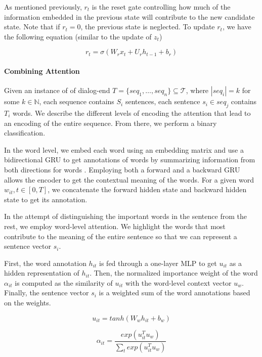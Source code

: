 As mentioned previously, $r_t$ is the reset gate 
controlling how much of the information embedded in 
the previous state will contribute to the new candidate state. 
Note that if $r_t = 0$, the previous state is neglected. 
To update $r_t$, we have the following equation (similar to the update of $z_t$)

\begin{equation*}
	r_t = \sigma(W_r x_t + U_r h_{t-1} + b_r)
\end{equation*}

\paragraph*{Combining Attention}
Given an instance of of dialog-end $T=\{seq_1, \ldots, seq_n\} \subseteq \mathcal{T}$, where $|seq_i| = k$ for some $k \in \mathbb{N}$, each sequence contains $S_i$ sentences, each sentence $s_i \in seq_j$ contains $T_i$ words. 
We describe the different levels of encoding the attention that lead 
to an encoding of the entire sequence. From there, we perform 
a binary classification. 

In the word level, we embed each word using an embedding matrix \cite{glove} 
and use a bidirectional GRU 
to get annotations of words by summarizing information
from both directions for words \cite{attention}. 
Employing both a forward and a backward GRU 
allows the encoder to get the contextual meaning of the words. 
For a given word $w_{it}, t\in [0,T]$, 
we concatenate the forward hidden state and
backward hidden state to get its annotation. 

In the attempt of distinguishing the important 
words in the sentence from the rest, we employ word-level 
attention. We highlight the words that most contribute 
to the meaning of the entire sentence so that we can represent 
a sentence vector $s_i$. 

First, the word annotation $h_{it}$ is fed 
through a one-layer MLP to get $u_{it}$ as a hidden representation
of $h_{it}$. Then, the normalized importance weight of the word $\alpha_{it}$ 
is computed as the similarity of $u_{it}$ with the word-level 
context vector $u_w$. 
Finally, the sentence vector $s_i$ is a weighted sum of the word annotations
based on the weights. 

\begin{equation*}
	u_{it} = tanh(W_w h_{it} + b_w)
\end{equation*}

\begin{equation*}
	\alpha_{it} = \frac{exp(u^T_{it} u_w)}{\sum_t exp(u^T_{it} u_w)}
\end{equation*}

